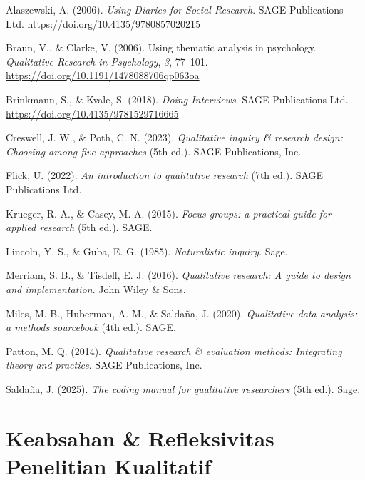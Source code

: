 \documentclass[
  indonesian,
  letterpaper,
  DIV=11,
  numbers=noendperiod]{scrreprt}
\newlength{\cslhangindent}
\newenvironment{CSLReferences}[2] %
 {\begin{list}{}{%
  \setlength{\itemindent}{0pt}
  \setlength{\leftmargin}{0pt}
  \setlength{\parsep}{0pt}
  \ifodd #1
   \setlength{\leftmargin}{\cslhangindent}
   \setlength{\itemindent}{-1\cslhangindent}
  \fi
  \setlength{\itemsep}{#2\baselineskip}}}
 {\end{list}}
\begin{document}
\label{refs--19}
\begin{CSLReferences}{1}{0}
Alaszewski, A. (2006). \emph{Using Diaries for Social Research}. SAGE
Publications Ltd. \url{https://doi.org/10.4135/9780857020215}

Braun, V., \& Clarke, V. (2006). Using thematic analysis in psychology.
\emph{Qualitative Research in Psychology}, \emph{3}, 77--101.
\url{https://doi.org/10.1191/1478088706qp063oa}

Brinkmann, S., \& Kvale, S. (2018). \emph{Doing Interviews}. SAGE
Publications Ltd. \url{https://doi.org/10.4135/9781529716665}

Creswell, J. W., \& Poth, C. N. (2023). \emph{Qualitative inquiry \&
research design: Choosing among five approaches} (5th ed.). SAGE
Publications, Inc.

Flick, U. (2022). \emph{An introduction to qualitative research} (7th
ed.). SAGE Publications Ltd.

Krueger, R. A., \& Casey, M. A. (2015). \emph{Focus groups: a practical
guide for applied research} (5th ed.). SAGE.

Lincoln, Y. S., \& Guba, E. G. (1985). \emph{Naturalistic inquiry}.
Sage.

Merriam, S. B., \& Tisdell, E. J. (2016). \emph{Qualitative research: A
guide to design and implementation}. John Wiley \& Sons.

Miles, M. B., Huberman, A. M., \& Saldaña, J. (2020). \emph{Qualitative
data analysis: a methods sourcebook} (4th ed.). SAGE.

Patton, M. Q. (2014). \emph{Qualitative research \& evaluation methods:
Integrating theory and practice}. SAGE Publications, Inc.

Saldaña, J. (2025). \emph{The coding manual for qualitative researchers}
(5th ed.). Sage.

\end{CSLReferences}

\chapter{Keabsahan \& Refleksivitas Penelitian
Kualitatif}\label{sec-keabsahan}
\end{document}
